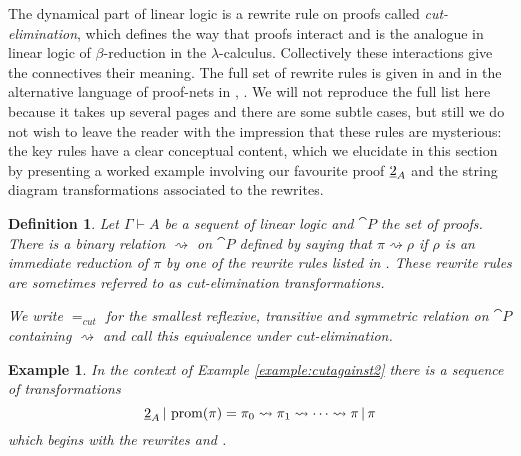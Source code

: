 \documentclass[english,letter paper,12pt,reqno]{article}
\theoremstyle{example}
\newtheorem{definition}[theorem]{Definition}
\newtheorem{example}[theorem]{Example}
\numberwithin{equation}{section}
\begin{document}
The dynamical part of linear logic is a rewrite rule on proofs called \emph{cut-elimination}, which defines the way that proofs interact and is the analogue in linear logic of $\beta$-reduction in the $\lambda$-calculus. Collectively these interactions give the connectives their meaning. The full set of rewrite rules is given in \cite[Section 3]{mellies} and in the alternative language of proof-nets in \cite[\S 4]{girard_llogic}, \cite[p.18]{pagani}. We will not reproduce the full list here because it takes up several pages and there are some subtle cases, but still we do not wish to leave the reader with the impression that these rules are mysterious: the key rules have a clear conceptual content, which we elucidate in this section by presenting a worked example involving our favourite proof $\underline{2}_A$ and the string diagram transformations associated to the rewrites.

\begin{definition} Let $\Gamma \vdash A$ be a sequent of linear logic and $\cat{P}$ the set of proofs. There is a binary relation $\rightsquigarrow$ on $\cat{P}$ defined by saying that $\pi \rightsquigarrow \rho$ if $\rho$ is an immediate reduction of $\pi$ by one of the rewrite rules listed in \cite[Section 3]{mellies}. These rewrite rules are sometimes referred to as \emph{cut-elimination transformations}.

We write $=_{cut}$ for the smallest reflexive, transitive and symmetric relation on $\cat{P}$ containing $\rightsquigarrow$ and call this \emph{equivalence under cut-elimination}.
\end{definition}


\begin{example}
In the context of Example \ref{example:cutagainst2} there is a sequence of transformations
\[
\underline{2}_A \,|\, \operatorname{prom}( \pi ) = \pi_0 \rightsquigarrow \pi_1 \rightsquigarrow \cdots \rightsquigarrow \pi \,|\, \pi
\]
which begins with the rewrites \cite[\S 3.9.3]{mellies} and \cite[\S 3.9.1]{mellies}.
\end{example}
\end{document}
